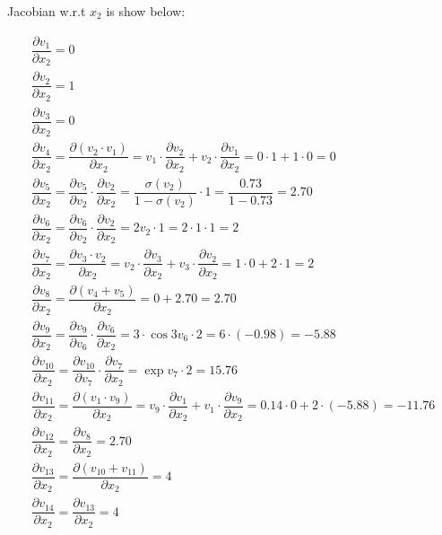 \documentclass[12pt]{article}
\begin{document}
\begin{enumerate}[label=(\roman*)]
Jacobian w.r.t $x_2$ is show below:\\
\begin{fleqn}
    \begin{gather*}
        \dfrac{\partial v_{1}}{\partial x_{2}} =  0 \\
        \dfrac{\partial v_{2}}{\partial x_{2}} =  1  \\
        \dfrac{\partial v_{3}}{\partial x_{2}} = 0  \\
        \dfrac{\partial v_{4}}{\partial x_{2}} = \dfrac{\partial (v_{2}\cdot v_1)}{\partial x_{2}} = v_1\cdot\dfrac{\partial v_{2}}{\partial x_{2}} + v_2\cdot\dfrac{\partial v_{1}}{\partial x_{2}} = 0\cdot 1 + 1\cdot 0 = 0   \\
        \dfrac{\partial v_{5}}{\partial x_{2}} = \dfrac{\partial v_{5}}{\partial v_{2}}\cdot \dfrac{\partial v_{2}}{\partial x_{2}} =  \dfrac{\sigma(v_2)}{1-\sigma(v_2)} \cdot 1 = \dfrac{0.73}{1-0.73} = 2.70  \\ 
        \dfrac{\partial v_{6}}{\partial x_{2}} = \dfrac{\partial v_{6}}{\partial v_{2}} \cdot \dfrac{\partial v_{2}}{\partial x_{2}} = 2 v_2 \cdot 1 = 2 \cdot 1 \cdot 1 = 2 \\
        \dfrac{\partial v_{7}}{\partial x_{2}} = \dfrac{\partial v_{3}\cdot v_2}{\partial x_{2}} = v_2 \cdot \dfrac{\partial v_{3}}{\partial x_{2}} + v_3 \cdot \dfrac{\partial v_{2}}{\partial x_{2}} = 1 \cdot 0 + 2 \cdot 1 = 2 \\ 
        \dfrac{\partial v_{8}}{\partial x_{2}} = \dfrac{\partial (v_{4} + v_5)}{\partial x_{2}} = 0 + 2.70 = 2.70  \\
        \dfrac{\partial v_{9}}{\partial x_{2}} = \dfrac{\partial v_{9}}{\partial v_{6}} \cdot \dfrac{\partial v_{6}}{\partial x_{2}} = 3 \cdot \cos{3v_6} \cdot 2 =  6 \cdot (-0.98) = -5.88  \\
        \dfrac{\partial v_{10}}{\partial x_{2}} = \dfrac{\partial v_{10}}{\partial v_{7}} \cdot \dfrac{\partial v_{7}}{\partial x_{2}}  = \exp{v_7} \cdot 2 = 15.76  \\
        \dfrac{\partial v_{11}}{\partial x_{2}} = \dfrac{\partial (v_{1}\cdot v_9)}{\partial x_{2}} = v_9\cdot\dfrac{\partial v_{1}}{\partial x_{2}} + v_1\cdot\dfrac{\partial v_{9}}{\partial x_{2}} = 0.14 \cdot 0 + 2\cdot (-5.88) = -11.76  \\
        \dfrac{\partial v_{12}}{\partial x_{2}} = \dfrac{\partial v_{8}}{\partial x_{2}} = 2.70  \\
        \dfrac{\partial v_{13}}{\partial x_{2}} = \dfrac{\partial (v_{10} + v_11)}{\partial x_{2}} = 4  \\
        \dfrac{\partial v_{14}}{\partial x_{2}} = \dfrac{\partial v_{13}}{\partial x_{2}}  = 4 \\
    \end{gather*}
\end{fleqn}


\end{enumerate}
\end{document}
